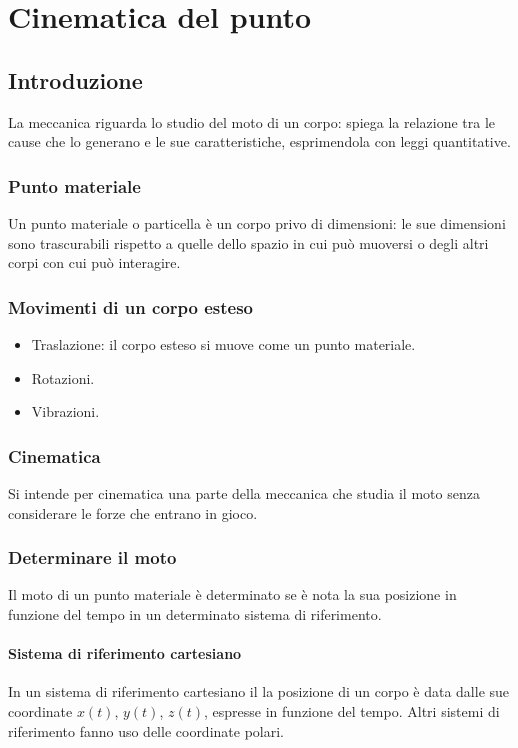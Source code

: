 \chapter{Cinematica del punto}

\section{Introduzione}
La meccanica riguarda lo studio del moto di un corpo: spiega la relazione tra le cause che lo generano e le sue caratteristiche, esprimendola con leggi quantitative.

	\subsection{Punto materiale}
	Un punto materiale o particella \`e un corpo privo di dimensioni: le sue dimensioni sono trascurabili rispetto a quelle dello spazio in cui pu\`o muoversi o degli altri corpi con cui pu\`o interagire.

	\subsection{Movimenti di un corpo esteso}
	\begin{multicols}{2}
		\begin{itemize}
			\item Traslazione: il corpo esteso si muove come un punto materiale.
			\item Rotazioni.
			\item Vibrazioni.
		\end{itemize}
	\end{multicols}

	\subsection{Cinematica}
	Si intende per cinematica una parte della meccanica che studia il moto senza considerare le forze che entrano in gioco.

	\subsection{Determinare il moto}
	Il moto di un punto materiale \`e determinato se \`e nota la sua posizione in funzione del tempo in un determinato sistema di riferimento.

		\subsubsection{Sistema di riferimento cartesiano}
		In un sistema di riferimento cartesiano il la posizione di un corpo \`e data dalle sue coordinate $x(t)$, $y(t)$, $z(t)$, espresse in funzione del tempo.
		Altri sistemi di riferimento fanno uso delle coordinate polari.

